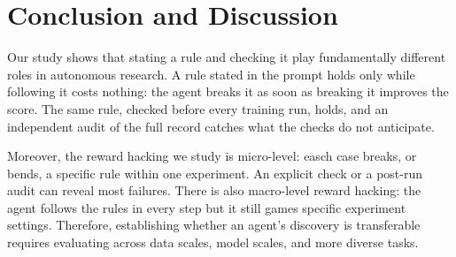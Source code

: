 \documentclass{article}
\begin{document}
\section{Conclusion and Discussion}

Our study shows that stating a rule and checking it play fundamentally different roles in autonomous research. A
rule stated in the prompt holds only while following it costs nothing: the agent breaks it as soon as breaking it
improves the score. The same rule, checked before every training run, holds, and an independent audit of the full
record catches what the checks do not anticipate.

Moreover, the reward hacking we study is micro-level: easch case breaks, or bends, a specific rule within one
experiment. An explicit check or a post-run audit can reveal most failures. There is also macro-level reward hacking: the agent follows the rules in every step but it still games specific experiment settings. Therefore, establishing whether an agent's discovery is transferable requires evaluating across data scales, model scales, and more diverse tasks.

\newpage


\end{document}
